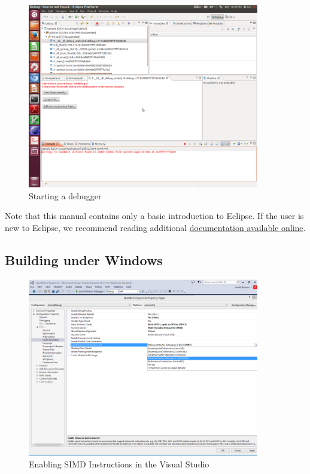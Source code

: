 \documentclass[runningheads,a4paper]{llncs}
\begin{document}
{\begin{figure}
\centering
\caption{\label{FigDebug}Starting a debugger}
\includegraphics[width=0.9\textwidth]{figures/EclipseDebug.pdf}
\end{figure}


Note that this manual contains only a basic introduction to Eclipse.
If the user is new to Eclipse, we recommend reading
additional \href{http://www.eclipse.org/downloads/moreinfo/c.php}{documentation available online}.


\subsection{Building under Windows}\label{SectionBuildWindows}

\begin{figure}
\centering
\caption{\label{FigAVXSet}Enabling SIMD Instructions in the Visual Studio}
\includegraphics[width=0.9\textwidth]{figures/SettingAVXinVS2012.pdf}
\end{figure}

}
\end{document}
